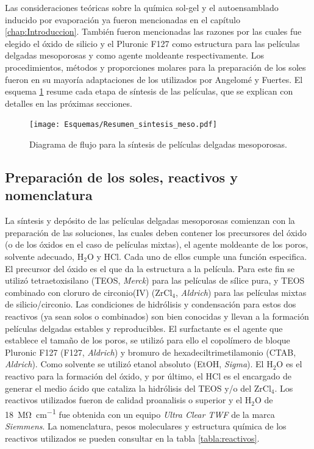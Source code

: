 	 Las consideraciones teóricas sobre la química sol-gel y el autoensamblado inducido por evaporación ya fueron mencionadas en el capítulo \ref{chap:Introduccion}. También fueron mencionadas las razones por las cuales fue elegido el óxido de silicio y el Pluronic F127 como estructura para las películas delgadas mesoporosas y como agente moldeante respectivamente. Los procedimientos, métodos y proporciones molares para la preparación de los soles fueron en su mayoría adaptaciones de los utilizados por Angelomé\cite{Angelome2008} y Fuertes\cite{Fuertes2009}. El esquema \ref{esq:peliculas_meso} resume cada etapa de síntesis de las películas, que se explican con detalles en las próximas secciones.
		  \begin{figure}[ht]
			  \begin{center}
			  \texttt{[image: Esquemas/Resumen\_sintesis\_meso.pdf]}
			  \caption[Síntesis de películas delgadas mesoporosas]{Diagrama de flujo para la síntesis de películas delgadas mesoporosas.}
			  \label{esq:peliculas_meso}
			  \end{center}
			  \end{figure}

	\subsection{Preparación de los soles, reactivos y nomenclatura}
		
			La síntesis y depósito de las películas delgadas mesoporosas comienzan con la preparación de las soluciones, las cuales deben contener los precursores del óxido (o de los óxidos en el caso de películas mixtas), el agente moldeante de los poros, solvente adecuado, H$_2$O y HCl\cite{Brinker1990}. Cada uno de ellos cumple una función especifica. El precursor del óxido es el que da la estructura a la película. Para este fin se utilizó tetraetoxisilano (TEOS, \textit{Merck}) para las películas de sílice pura, y TEOS combinado con cloruro de circonio(IV) (ZrCl$_4$, \textit{Aldrich}) para las películas mixtas de silicio/circonio. Las condiciones de hidrólisis y condensación para estos dos reactivos (ya sean solos o combinados) son bien conocidas y llevan a la formación películas delgadas estables y reproducibles\cite{Soler-Illia2004,Crepaldi2002a,Angelome2008}. El surfactante es el agente que establece el tamaño de los poros, se utilizó para ello el copolímero de bloque Pluronic F127 (F127, \textit{Aldrich}) y bromuro de hexadeciltrimetilamonio (CTAB, \textit{Aldrich}). Como solvente se utilizó etanol absoluto (EtOH, \textit{Sigma}). El H$_2$O es el reactivo para la formación del óxido, y por último, el HCl es el encargado de generar el medio ácido que cataliza la hidrólisis del TEOS y/o del ZrCl$_4$. Los reactivos utilizados fueron de calidad proanalisis o superior y el H$_2$O de \SI{18}{\mega\ohm\per\cm} fue obtenida con un equipo \textit{Ultra Clear TWF} de la marca \textit{Siemmens}. La nomenclatura, pesos moleculares y estructura química de los reactivos utilizados se pueden consultar en la tabla \ref{tabla:reactivos}.
					
